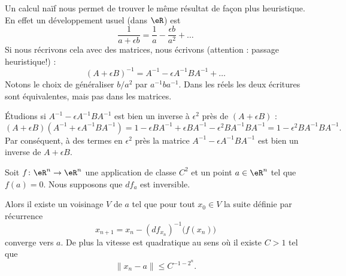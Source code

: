\begin{remark}
    Un calcul naïf nous permet de trouver le même résultat de façon plus heuristique. En effet un développement usuel (dans \( \eR\)) est
    \begin{equation}
        \frac{1}{ a+\epsilon b }=\frac{1}{ a }-\frac{ \epsilon b }{ a^2 }+\ldots
    \end{equation}
    Si nous récrivons cela avec des matrices, nous écrivons (attention : passage heuristique!) :
    \begin{equation}
        (A+\epsilon B)^{-1}=A^{-1}-\epsilon A^{-1} BA^{-1}+\ldots
    \end{equation}
    Notons le choix de généraliser \( b/a^2\) par \( a^{-1} ba^{-1}\). Dans les réels les deux écritures sont équivalentes, mais pas dans les matrices.

    Étudions si \( A^{-1}-\epsilon A^{-1}BA^{-1}\) est bien un inverse à \( \epsilon^2\) près de \( (A+\epsilon B)\) :
    \begin{equation}
        (A+\epsilon B)(A^{-1}+\epsilon A^{-1} BA^{-1})=1-\epsilon BA^{-1}+\epsilon BA^{-1}-\epsilon^2BA^{-1}BA^{-1}=1-\epsilon^2BA^{-1} BA^{-1}.
    \end{equation}
    Par conséquent, à des termes en \( \epsilon^2\) près la matrice \( A^{-1}-\epsilon A^{-1}BA^{-1}\) est bien un inverse de \( A+\epsilon B\).
\end{remark}


\begin{theorem}
    Soit \( f\colon \eR^n\to \eR^n\) une application de classe \( C^2\) et un point \( a\in \eR^n\) tel que \( f(a)=0\). Nous supposons que \( df_a\) est inversible.

    Alors il existe un voisinage \( V\) de \( a\) tel que pour tout \( x_0\in V\) la suite définie par récurrence
    \begin{equation}
        x_{n+1}=x_n-(df_{x_n})^{-1}\big( f(x_n) \big)
    \end{equation}
    converge vers \( a\). De plus la vitesse est quadratique au sens où il existe \( C>1\) tel que 
    \begin{equation}        \label{EqtkiDXt}
        \| x_n-a \|\leq C^{-1-2^n}.
    \end{equation}
\end{theorem}

